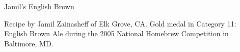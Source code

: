 \begin{recipe}{Jamil's English Brown} %

\begin{aboutblock}
Recipe by Jamil Zainasheff of Elk Grove, CA. Gold medal in Category 11: English
Brown Ale during the 2005 National Homebrew Competition in Baltimore, MD.
\sourceaha
\end{aboutblock}


\begin{methodandtiming}

\begin{mashsteps}
\end{mashsteps}

\end{methodandtiming}

\recipebreak

\begin{ingredientsblock}

\begin{malts}
\end{malts}

\begin{hops}
\end{hops}


\end{ingredientsblock}

\end{recipe}

